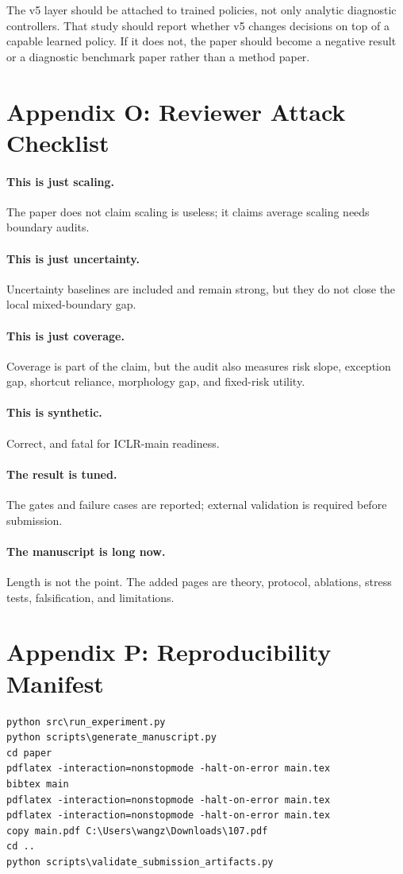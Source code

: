 \documentclass{article}
\begin{document}
The v5 layer should be attached to trained policies, not only analytic diagnostic controllers. That study should report whether v5 changes decisions on top of a capable learned policy. If it does not, the paper should become a negative result or a diagnostic benchmark paper rather than a method paper.


\section{Appendix O: Reviewer Attack Checklist}
\paragraph{This is just scaling.} The paper does not claim scaling is useless; it claims average scaling needs boundary audits.
\paragraph{This is just uncertainty.} Uncertainty baselines are included and remain strong, but they do not close the local mixed-boundary gap.
\paragraph{This is just coverage.} Coverage is part of the claim, but the audit also measures risk slope, exception gap, shortcut reliance, morphology gap, and fixed-risk utility.
\paragraph{This is synthetic.} Correct, and fatal for ICLR-main readiness.
\paragraph{The result is tuned.} The gates and failure cases are reported; external validation is required before submission.
\paragraph{The manuscript is long now.} Length is not the point. The added pages are theory, protocol, ablations, stress tests, falsification, and limitations.


\section{Appendix P: Reproducibility Manifest}
\begin{verbatim}
python src\run_experiment.py
python scripts\generate_manuscript.py
cd paper
pdflatex -interaction=nonstopmode -halt-on-error main.tex
bibtex main
pdflatex -interaction=nonstopmode -halt-on-error main.tex
pdflatex -interaction=nonstopmode -halt-on-error main.tex
copy main.pdf C:\Users\wangz\Downloads\107.pdf
cd ..
python scripts\validate_submission_artifacts.py
\end{verbatim}
\end{document}
